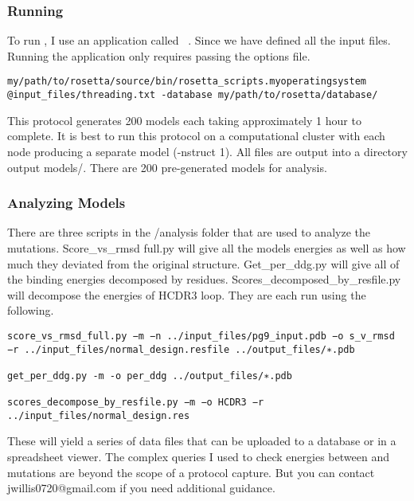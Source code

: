 \subsubsection{Running \rosetta}
To run \rosetta, I use an application called \scripts~\citep{Fleishman:2011ji}. Since we have defined all the input files. Running the application only requires passing the options file.

\begin{lstlisting}[breaklines=true]
my/path/to/rosetta/source/bin/rosetta_scripts.myoperatingsystem @input_files/threading.txt -database my/path/to/rosetta/database/
\end{lstlisting}

This protocol generates 200 models each taking approximately 1 hour to complete. It is best to run this protocol on a computational cluster with each node producing a separate model (-nstruct 1). All files are output into a directory output models/. There are 200 pre-generated models for analysis. \\

\subsubsection{Analyzing Models}
There are three scripts in the /analysis folder that are used to analyze the mutations. Score\_vs\_rmsd full.py will give all the models energies as well as how much they deviated from the original structure. Get\_per\_ddg.py will give all of the binding energies decomposed by residues. Scores\_decomposed\_by\_resfile.py will decompose the energies of HCDR3 loop. They are each run using the following.

\begin{lstlisting}[breaklines=true]
score_vs_rmsd_full.py −m −n ../input_files/pg9_input.pdb −o s_v_rmsd −r ../input_files/normal_design.resfile ../output_files/∗.pdb

get_per_ddg.py -m -o per_ddg ../output_files/∗.pdb

scores_decompose_by_resfile.py −m −o HCDR3 −r ../input_files/normal_design.res
\end{lstlisting}

These will yield a series of data files that can be uploaded to a database or in a spreadsheet viewer. The complex queries I used to check energies between  and mutations are beyond the scope of a protocol capture. But you can contact jwillis0720@gmail.com if you need additional guidance.



